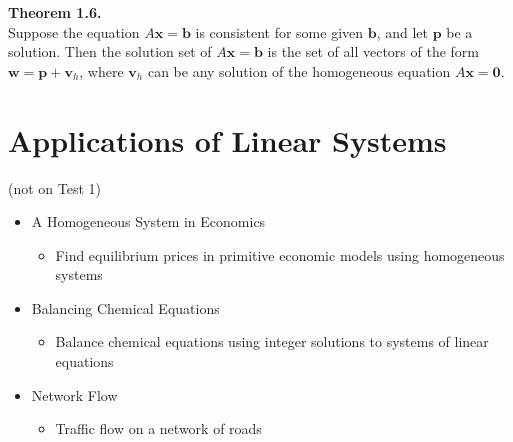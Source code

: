 \documentclass[10pt]{book}
\newenvironment{boxthm}{\begin{mdframed}[backgroundcolor=gray!30,nobreak=true]}{\end{mdframed}}
\newcommand{\vect}[1]{\ensuremath{\boldsymbol{\mathbf{#1}}}}
\begin{document}
\begin{boxthm}
	\textbf{Theorem 1.6.} \\
	Suppose the equation $A\vect{x}=\vect{b}$ is consistent for some given $\vect{b}$, and let $\vect{p}$ be a solution. Then the solution set of $A\vect{x}=\vect{b}$ is the set of all vectors of the form $\vect{w}=\vect{p}+\vect{v}_h$, where $\vect{v}_h$ can be any solution of the homogeneous equation $A\vect{x}=\vect{0}$.
\end{boxthm}
\vfill


\section{Applications of Linear Systems} (not on Test 1)
\begin{itemize}
	\item A Homogeneous System in Economics
		\begin{itemize}
			\item Find equilibrium prices in primitive economic models using homogeneous systems
		\end{itemize}
	\item Balancing Chemical Equations
	\begin{itemize}
		\item Balance chemical equations using integer solutions to systems of linear equations
	\end{itemize}
	\item Network Flow
	\begin{itemize}
		\item Traffic flow on a network of roads
	\end{itemize}
\end{itemize}
\vfill


\newpage


\end{document}
